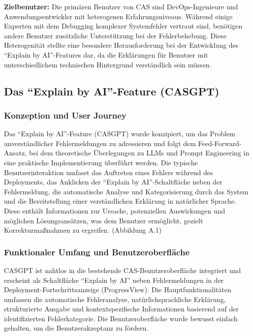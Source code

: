\documentclass[
  a4paper,
  12pt,
  oneside,
  open=any,
  BCOR=12mm,
  DIV=14,
  parskip=half*,
  headsepline,
  footsepline,
  pointlessnumbers,
  liststotoc,
  numbers=noenddot,
  listof=totoc]{scrartcl}
\begin{document}
\textbf{Zielbenutzer:} Die primären Benutzer von CAS sind
DevOps-Ingenieure und Anwendungsentwickler mit heterogenen
Erfahrungsniveaus. Während einige Experten mit dem Debugging komplexer
Systemfehler vertraut sind, benötigen andere Benutzer zusätzliche
Unterstützung bei der Fehlerbehebung. Diese Heterogenität stellte eine
besondere Herausforderung bei der Entwicklung des ``Explain by
AI''-Features dar, da die Erklärungen für Benutzer mit unterschiedlichem
technischen Hintergrund verständlich sein müssen.

\subsection{Das ``Explain by AI''-Feature
(CASGPT)}\label{das-explain-by-ai-feature-casgpt}

\subsubsection{Konzeption und User
Journey}\label{konzeption-und-user-journey}

Das ``Explain by AI''-Feature (CASGPT) wurde konzipiert, um das Problem
unverständlicher Fehlermeldungen zu adressieren und folgt dem
Feed-Forward-Ansatz, bei dem theoretische Überlegungen zu LLMs und
Prompt Engineering in eine praktische Implementierung überführt werden.
Die typische Benutzerinteraktion umfasst das Auftreten eines Fehlers
während des Deployments, das Anklicken der ``Explain by
AI''-Schaltfläche neben der Fehlermeldung, die automatische Analyse und
Kategorisierung durch das System und die Bereitstellung einer
verständlichen Erklärung in natürlicher Sprache. Diese enthält
Informationen zur Ursache, potenziellen Auswirkungen und möglichen
Lösungsansätzen, was dem Benutzer ermöglicht, gezielt Korrekturmaßnahmen
zu ergreifen. (Abbildung A.1)

\subsubsection{Funktionaler Umfang und
Benutzeroberfläche}\label{funktionaler-umfang-und-benutzeroberfluxe4che}

CASGPT ist nahtlos in die bestehende CAS-Benutzeroberfläche integriert
und erscheint als Schaltfläche ``Explain by AI'' neben Fehlermeldungen
in der Deployment-Fortschrittsanzeige (ProgressView). Die
Hauptfunktionalitäten umfassen die automatische Fehleranalyse,
natürlichsprachliche Erklärung, strukturierte Ausgabe und
kontextspezifische Informationen basierend auf der identifizierten
Fehlerkategorie. Die Benutzeroberfläche wurde bewusst einfach gehalten,
um die Benutzerakzeptanz zu fördern.
\end{document}
